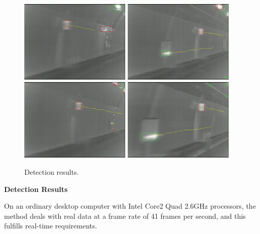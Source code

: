 \begin{figure}
{
\includegraphics[width=0.47\textwidth,bb=0 0 640 480]{17veriTrjimg00039.jpg}
}
{
\includegraphics[width=0.47\textwidth,bb=0 0 640 480]{8veriTrjimg00028.jpg}
}\\
{
\includegraphics[width=0.47\textwidth,bb=0 0 640 480]{19veriTrjimg00041.jpg}
}
{
\includegraphics[width=0.47\textwidth,bb=0 0 640 480]{3veriTrjimg00023.jpg}
}
\caption{Detection results.}
\label{fig:sixs}
\end{figure}

\textbf{Detection Results}

On an ordinary desktop computer with Intel Core2 Quad 2.6GHz processors, the method deals with real data at a frame rate of 41 frames per second, and this fulfills real-time requirements.


